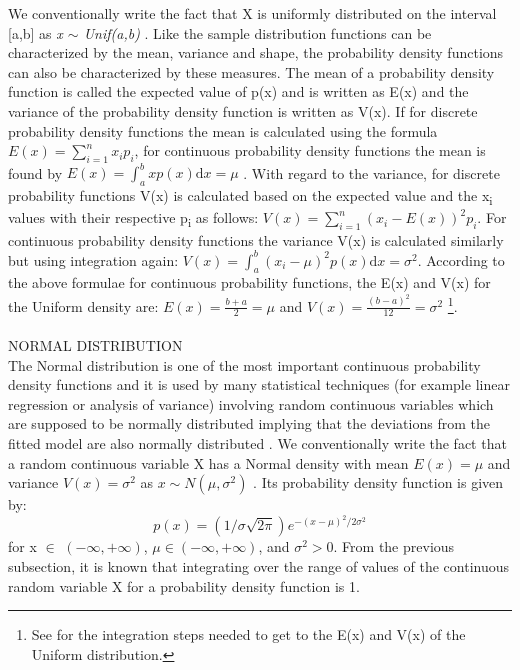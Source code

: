 \documentclass {article}
\begin{document}
We conventionally write the fact that X is uniformly distributed on the interval [a,b] as \textit{x $\sim$ Unif(a,b)} \cite{jackman_bayesian_2009}.
Like the sample distribution functions can be characterized by the mean, variance and shape, the probability density functions can also be characterized by these measures. 
The mean of a probability density function is called the expected value of p(x) and is written as E(x) and the variance of the probability density function is written as V(x). 
If for discrete probability density functions the mean is calculated using the formula $E(x)=\sum_{i=1}^{n}x_i p_i$, for continuous probability density functions the mean is found by $E(x)=\int_a^bxp(x)\mathrm{d}x=\mu$ \cite{lial_calculus_2012}.
With regard to the variance, for discrete probability functions V(x) is calculated based on the expected value and the x\textsubscript{i} values with their respective p\textsubscript{i} as follows: $V(x)=\sum_{i=1}^{n}(x_i-E(x))^2p_i$.
 For continuous probability density functions the variance V(x) is calculated similarly but using integration again: $V(x)=\int_a^b(x_i-\mu)^2p(x)\mathrm{d}x = \sigma^2$.    
According to the above formulae for continuous probability functions, the E(x) and V(x) for the Uniform density are: $E(x)=\frac{b+a}{2}=\mu$ and $V(x)=\frac{(b-a)^2}{12}=\sigma^2$ \footnote{See \cite{lial_calculus_2012} for the integration steps needed to get to the E(x) and V(x) of the Uniform distribution.}.   
\\
\\
NORMAL DISTRIBUTION\\
The Normal distribution is one of the most important continuous probability density functions and it is used by many statistical techniques (for example linear regression or analysis of variance) involving random continuous variables which are supposed to be normally distributed implying that the deviations from the fitted model are also normally distributed \cite{quinn_experimental_2002} \cite{lial_calculus_2012}. 
We conventionally write the fact that a random continuous variable X has a Normal density with mean $E(x)=\mu$ and variance $V(x)=\sigma^2$ as $x\sim N(\mu, \sigma^2)$ \cite{lial_calculus_2012}.
 Its probability density function is given by:
\tab
\begin{equation}   
p(x) = \left(1 /\sigma \sqrt {2\pi } \right) e^{{ - \left( x - \mu  \right)^2 } / {2\sigma ^2 }} 
\end{equation}
for x $\in$ $(-\infty, +\infty)$, $\mu \in (-\infty, +\infty)$, and $\sigma^2 > 0$.        
From the previous subsection, it is known that integrating over the range of values of the continuous random variable X for a probability density function is 1. 
\end{document}
